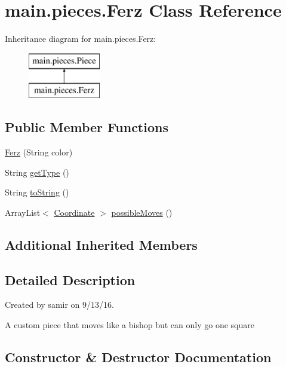 \hypertarget{classmain_1_1pieces_1_1_ferz}{}\section{main.\+pieces.\+Ferz Class Reference}
\label{classmain_1_1pieces_1_1_ferz}
Inheritance diagram for main.\+pieces.\+Ferz\+:\begin{figure}[H]
\begin{center}
\leavevmode
\includegraphics[height=2.000000cm]{classmain_1_1pieces_1_1_ferz}
\end{center}
\end{figure}
\subsection*{Public Member Functions}
\begin{DoxyCompactItemize}
\item 
\hyperlink{classmain_1_1pieces_1_1_ferz_a84fcf93b3400ec63737f39bd30f0083c}{Ferz} (String color)
\item 
String \hyperlink{classmain_1_1pieces_1_1_ferz_ad103c7f8a3d02e36fb8d6a52db0ef7cc}{get\+Type} ()
\item 
String \hyperlink{classmain_1_1pieces_1_1_ferz_ad4b187dafd0c861a6dbb0874e4245b79}{to\+String} ()
\item 
Array\+List$<$ \hyperlink{classmain_1_1model_1_1_coordinate}{Coordinate} $>$ \hyperlink{classmain_1_1pieces_1_1_ferz_a46bd9fd8889a0209540603f723b233af}{possible\+Moves} ()
\end{DoxyCompactItemize}
\subsection*{Additional Inherited Members}


\subsection{Detailed Description}
Created by samir on 9/13/16.

A custom piece that moves like a bishop but can only go one square 

\subsection{Constructor \& Destructor Documentation}
\hypertarget{classmain_1_1pieces_1_1_ferz_a84fcf93b3400ec63737f39bd30f0083c}{}\label{classmain_1_1pieces_1_1_ferz_a84fcf93b3400ec63737f39bd30f0083c} 
